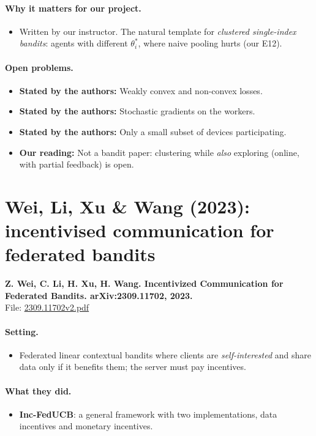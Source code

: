 \documentclass[11pt]{article}
\newcommand{\stated}{\textcolor{green!40!black}{\textbf{Stated by the authors:}}}
\newcommand{\ours}{\textcolor{orange!80!black}{\textbf{Our reading:}}}
\newcommand{\file}[1]{\url{#1}}
\begin{document}
\paragraph{Why it matters for our project.}
\begin{itemize}\item Written by our instructor. The natural template for \emph{clustered single-index bandits}: agents with different $\theta^*_i$, where naive pooling hurts (our E12).\end{itemize}
\paragraph{Open problems.}
\begin{itemize}\item \stated{} Weakly convex and non-convex losses.\item \stated{} Stochastic gradients on the workers.\item \stated{} Only a small subset of devices participating.\item \ours{} Not a bandit paper: clustering while \emph{also} exploring (online, with partial feedback) is open.\end{itemize}
\section{Wei, Li, Xu \& Wang (2023): incentivised communication for federated bandits}
\textbf{Z. Wei, C. Li, H. Xu, H. Wang. Incentivized Communication for Federated Bandits. arXiv:2309.11702, 2023.}\\ File: \file{2309.11702v2.pdf}
\paragraph{Setting.}
\begin{itemize}\item Federated linear contextual bandits where clients are \emph{self-interested} and share data only if it benefits them; the server must pay incentives.\end{itemize}
\paragraph{What they did.}
\begin{itemize}\item \textbf{Inc-FedUCB}: a general framework with two implementations, data incentives and monetary incentives.\end{itemize}
\end{document}
